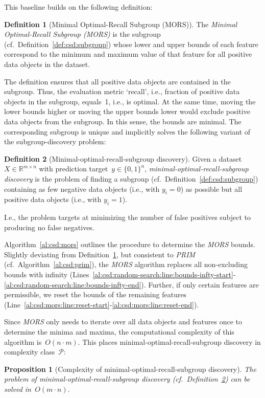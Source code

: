 \documentclass{article}
\newtheorem{proposition}{Proposition}
\theoremstyle{definition}
\newtheorem{definition}{Definition}
\begin{document}
This baseline builds on the following definition:
%
\begin{definition}[Minimal Optimal-Recall Subgroup (MORS)]
	The \emph{Minimal Op\-timal-Recall Subgroup (MORS)} is the subgroup (cf.~Definition~\ref{def:csd:subgroup}) whose lower and upper bounds of each feature correspond to the minimum and maximum value of that feature for all positive data objects in the dataset.
	\label{def:csd:mors}
\end{definition}
%
The definition ensures that all positive data objects are contained in the subgroup.
Thus, the evaluation metric `recall', i.e., fraction of positive data objects in the subgroup, equals~1, i.e., is optimal.
At the same time, moving the lower bounds higher or moving the upper bounds lower would exclude positive data objects from the subgroup.
In this sense, the bounds are minimal.
The corresponding subgroup is unique and implicitly solves the following variant of the subgroup-discovery problem:
%
\begin{definition}[Minimal-optimal-recall-subgroup discovery]
	Given a dataset $X \in \mathbb{R}^{m \times n}$ with prediction target~$y \in \{0, 1\}^n$,
	\emph{minimal-optimal-recall-subgroup discovery} is the problem of finding a subgroup (cf.~Definition~\ref{def:csd:subgroup}) containing as few negative data objects (i.e., with $y_i = 0$) as possible but all positive data objects (i.e., with $y_i = 1$).
	\label{def:csd:minimal-optimal-recall-subgroup-discovery}
\end{definition}
%
I.e., the problem targets at minimizing the number of false positives subject to producing no false negatives.

Algorithm~\ref{al:csd:mors} outlines the procedure to determine the \emph{MORS} bounds.
Slightly deviating from Definition~\ref{def:csd:mors}, but consistent to \emph{PRIM} (cf.~Algorithm~\ref{al:csd:prim}), the \emph{MORS} algorithm replaces all non-excluding bounds with infinity (Lines~\ref{al:csd:random-search:line:bounds-infty-start}-\ref{al:csd:random-search:line:bounds-infty-end}).
Further, if only certain features are permissible, we reset the bounds of the remaining features (Line~\ref{al:csd:mors:line:reset-start}-\ref{al:csd:mors:line:reset-end}).

Since \emph{MORS} only needs to iterate over all data objects and features once to determine the minima and maxima, the computational complexity of this algorithm is~$O(n \cdot m)$.
This places minimal-optimal-recall-subgroup discovery in complexity class~$\mathcal{P}$:
%
\begin{proposition}[Complexity of minimal-optimal-recall-subgroup discovery]
	The problem of minimal-optimal-recall-subgroup discovery (cf.~Definition~\ref{def:csd:minimal-optimal-recall-subgroup-discovery}) can be solved in~$O(m \cdot n)$.
	\label{prop:csd:complexity-unconstrained-minimal-optimal-recall-subgroup-discovery}
\end{proposition}
\end{document}
